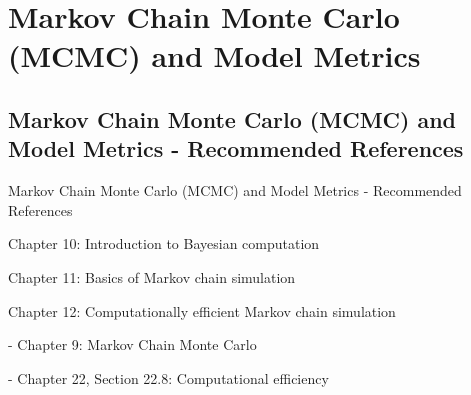 \section{Markov Chain Monte Carlo (MCMC) and Model Metrics}

\subsection{Markov Chain Monte Carlo (MCMC) and Model Metrics - Recommended References}
\begin{frame}{Markov Chain Monte Carlo (MCMC) and Model Metrics - Recommended References}
	\begin{vfilleditems}
		\item \textcite{gelman2013bayesian}
		\begin{vfilleditems}
			\item Chapter 10: Introduction to Bayesian computation
			\item Chapter 11: Basics of Markov chain simulation
			\item Chapter 12: Computationally efficient Markov chain simulation
		\end{vfilleditems}
		\item \textcite{mcelreath2020statistical} - Chapter 9: Markov Chain Monte Carlo
		\item \textcite{neal2011mcmc}
		\item \textcite{betancourtConceptualIntroductionHamiltonian2017}
		\item \textcite{gelman2020regression} - Chapter 22, Section 22.8: Computational efficiency
		\item \textcite{chibUnderstandingMetropolisHastingsAlgorithm1995}
		\item \textcite{casellaExplainingGibbsSampler1992}
	\end{vfilleditems}
\end{frame}

